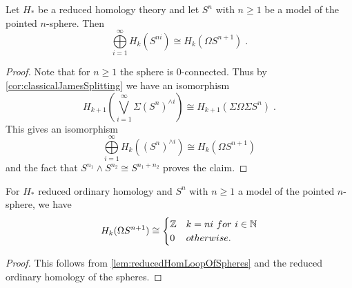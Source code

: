 \begin{lemma}\label{lem:reducedHomLoopOfSpheres}
    Let $H_*$ be a reduced homology theory and let $S^n$ with $n\geq1$ be a model of the pointed $n$-sphere.
    Then
    \begin{equation*}
        \bigoplus\limits_{i=1}^{\infty}H_k(S^{ni})\cong H_k(\Omega S^{n+1})\;.
    \end{equation*}
    \begin{proof}
        Note that for $n\geq1$ the sphere is $0$-connected.
        Thus by \cref{cor:classicalJamesSplitting} we have an isomorphism 
        \begin{equation*}
            H_{k+1}\left(\bigvee\limits_{i=1}^{\infty}\Sigma \left(S^n\right)^{\wedge i}\right)\cong H_{k+1}\left(\Sigma\Omega\Sigma S^n\right)\;.
        \end{equation*}
        This gives an isomorphism
        \begin{equation*}
            \bigoplus\limits_{i=1}^{\infty}H_k\left(\left(S^n\right)^{\wedge i}\right)\cong H_k\left(\Omega S^{n+1}\right)
        \end{equation*}
        and the fact that $S^{n_1}\wedge S^{n_2}\cong S^{n_1+n_2}$ proves the claim.
    \end{proof}
\end{lemma}
\begin{corollary}
    For $H_*$ reduced ordinary homology and $S^n$ with $n\geq1$ a model of the pointed $n$-sphere, we have
    \begin{equation*}
        H_k(\Omega S^{n+1})\cong
        \begin{cases}
            \mathbb{Z} & k=ni ~for~ i\in\mathbb{N}\\
            0 & otherwise.
        \end{cases}
    \end{equation*}
    \begin{proof}
        This follows from \cref{lem:reducedHomLoopOfSpheres} and the reduced ordinary homology of the spheres.
    \end{proof}
\end{corollary}

